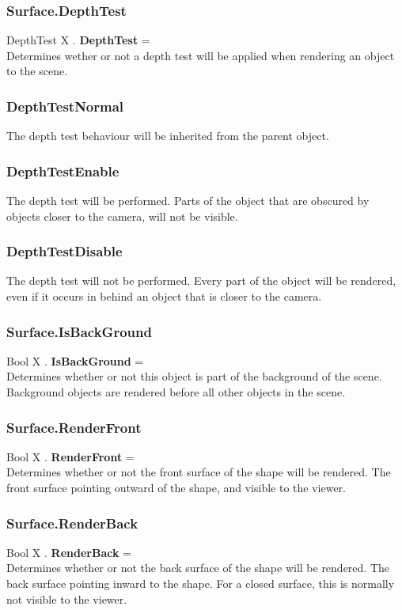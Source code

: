 \documentclass[10pt]{book}
\begin{document}
\subsubsection{Surface.DepthTest \label{F:Surface:DepthTest}}
DepthTest X . \textbf{DepthTest} = \\
Determines wether or not a depth test will be applied when rendering an object to the scene.

\subsubsection{DepthTestNormal \label{T:DepthTest|DepthTestNormal}}
The depth test behaviour will be inherited from the parent object.

\subsubsection{DepthTestEnable \label{T:DepthTest|DepthTestEnable}}
The depth test will be performed. Parts of the object that are obscured by objects closer to the camera, will not be visible.

\subsubsection{DepthTestDisable \label{T:DepthTest|DepthTestDisable}}
The depth test will not be performed. Every part of the object will be rendered, even if it occurs in behind an object that is closer to the camera.

\subsubsection{Surface.IsBackGround \label{F:Surface:IsBackGround}}
Bool X . \textbf{IsBackGround} = \\
Determines whether or not this object is part of the background of the scene. Background objects are rendered before all other objects in the scene.

\subsubsection{Surface.RenderFront \label{F:Surface:RenderFront}}
Bool X . \textbf{RenderFront} = \\
Determines whether or not the front surface of the shape will be rendered. The front surface pointing outward of the shape, and visible to the viewer.

\subsubsection{Surface.RenderBack \label{F:Surface:RenderBack}}
Bool X . \textbf{RenderBack} = \\
Determines whether or not the back surface of the shape will be rendered. The back surface pointing inward to the shape. For a closed surface, this is normally not visible to the viewer.
\end{document}
